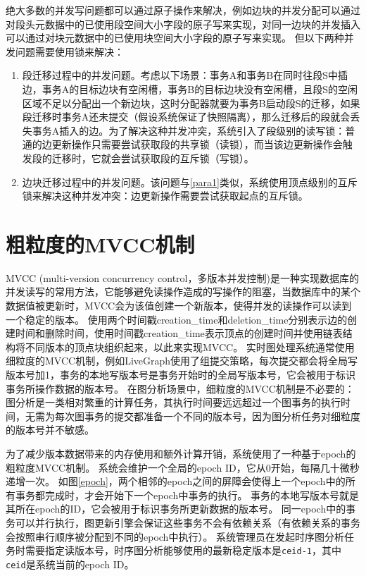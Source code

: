 绝大多数的并发写问题都可以通过原子操作来解决，例如边块的并发分配可以通过对段头元数据中的已使用段空间大小字段的原子写来实现，对同一边块的并发插入可以通过对块元数据中的已使用块空间大小字段的原子写来实现。
但以下两种并发问题需要使用锁来解决：
\begin{enumerate}
    \item \label{para1} 段迁移过程中的并发问题。考虑以下场景：事务A和事务B在同时往段S中插边，事务A的目标边块有空闲槽，事务B的目标边块没有空闲槽，且段S的空闲区域不足以分配出一个新边块，这时分配器就要为事务B启动段S的迁移，如果段迁移时事务A还未提交（假设系统保证了快照隔离），那么迁移后的段就会丢失事务A插入的边。为了解决这种并发冲突，系统引入了段级别的读写锁：普通的边更新操作只需要尝试获取段的共享锁（读锁），而当该边更新操作会触发段的迁移时，它就会尝试获取段的互斥锁（写锁）。
    \item 边块迁移过程中的并发问题。该问题与\ref{para1}类似，系统使用顶点级别的互斥锁来解决这种并发冲突：边更新操作需要尝试获取起点的互斥锁。
\end{enumerate}

\section{粗粒度的MVCC机制}
MVCC (multi-version concurrency control，多版本并发控制)是一种实现数据库的并发读写的常用方法，它能够避免读操作造成的写操作的阻塞，当数据库中的某个数据值被更新时，MVCC会为该值创建一个新版本，使得并发的读操作可以读到一个稳定的版本。
\store 使用两个时间戳creation\_time和deletion\_time分别表示边的创建时间和删除时间，使用时间戳creation\_time表示顶点的创建时间并使用链表结构将不同版本的顶点块组织起来，以此来实现MVCC。
实时图处理系统通常使用细粒度的MVCC机制，例如LiveGraph使用了组提交策略\cite{grpcmt}，每次提交都会将全局写版本号加1，事务的本地写版本号是事务开始时的全局写版本号，它会被用于标识事务所操作数据的版本号。
在图分析场景中，细粒度的MVCC机制是不必要的：图分析是一类相对繁重的计算任务，其执行时间要远远超过一个图事务的执行时间，无需为每次图事务的提交都准备一个不同的版本号，因为图分析任务对细粒度的版本号并不敏感。

为了减少版本数据带来的内存使用和额外计算开销，系统使用了一种基于epoch的粗粒度MVCC机制。
系统会维护一个全局的epoch ID，它从0开始，每隔几十微秒递增一次。
如图\ref{epoch}，两个相邻的epoch之间的屏障会使得上一个epoch中的所有事务都完成时，才会开始下一个epoch中事务的执行。
事务的本地写版本号就是其所在epoch的ID，它会被用于标识事务所更新数据的版本号。
同一epoch中的事务可以并行执行，图更新引擎会保证这些事务不会有依赖关系（有依赖关系的事务会按照串行顺序被分配到不同的epoch中执行）。
系统管理员在发起时序图分析任务时需要指定读版本号，时序图分析能够使用的最新稳定版本是\texttt{ceid-1}，其中\texttt{ceid}是系统当前的epoch ID。
 
